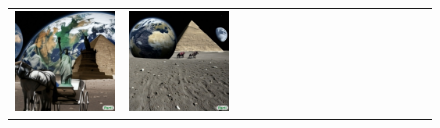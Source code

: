 \begin{figure}
\begin{adjustwidth}{-0.8in}{-0.5in}
\begin{tabular}{cccccccccccccccccccc}
\multicolumn{3}{c}{\includegraphics[width=\twobytwocolwidth\textwidth]{figures/limitations/moon_impossible1.jpg}} &
\multicolumn{3}{c}{\includegraphics[width=\twobytwocolwidth\textwidth]{figures/limitations/moon_impossible2.jpg}} \\

\end{tabular}
\end{adjustwidth}
\end{figure}
